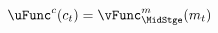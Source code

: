   \begin{equation}\begin{gathered}\begin{aligned}
        \uFunc^{{c}}({c}_{t})  & = \null{\vFunc}^{{m}}_{\MidStge}({m}_{t})\label{eq:Envelope}
      \end{aligned}\end{gathered}\end{equation}

